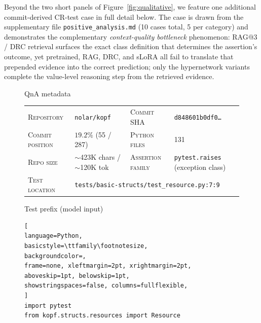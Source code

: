 \documentclass{llmxive}
\begin{document}
Beyond the two short panels of Figure~\ref{fig:qualitative}, we feature one additional commit-derived CR-test case in full detail below.
The case is drawn from the supplementary file \texttt{positive\_analysis.md} (10 cases total, 5 per category) and demonstrates the complementary \emph{context-quality bottleneck} phenomenon: RAG@3 / DRC retrieval surfaces the exact class definition that determines the assertion's outcome, yet pretrained, RAG, DRC, and sLoRA all fail to translate that prepended evidence into the correct prediction; only the hypernetwork variants complete the value-level reasoning step from the retrieved evidence.



\begin{figure}[!htbp]
\begin{center}
\begin{tcolorbox}[
enhanced,
colback=white, colframe=qexHead, coltitle=white,
fonttitle=\bfseries,
title={Detailed qualitative example: \texttt{nolar/kopf} (Code2LoRA-exclusive, CR test, commit-derived)},
arc=3pt, boxrule=0.6pt,
top=3pt, bottom=3pt, left=6pt, right=6pt,
]

\begin{qexsection}{QnA metadata}
\footnotesize
\begin{tabular}{@{}l@{\;\;}l@{\hskip 14pt}l@{\;\;}l@{}}
\textsc{Repository}      & \texttt{nolar/kopf}                         & \textsc{Commit SHA}        & \texttt{d848601b0df0\ldots} \\
\textsc{Commit position} & $19.2\%$ (55 / 287)                         & \textsc{Python files}      & 131 \\
\textsc{Repo size}       & $\sim$423K chars / $\sim$120K tok           & \textsc{Assertion family}  & \texttt{pytest.raises} (exception class) \\
\textsc{Test location}   & \multicolumn{3}{l}{\texttt{tests/basic-structs/test\_resource.py:7:9}} \\
\end{tabular}
\end{qexsection}

\begin{qexsection}{Test prefix (model input)}
\begin{lstlisting}[
language=Python,
basicstyle=\ttfamily\footnotesize,
backgroundcolor=,
frame=none, xleftmargin=2pt, xrightmargin=2pt,
aboveskip=1pt, belowskip=1pt,
showstringspaces=false, columns=fullflexible,
]
import pytest
from kopf.structs.resources import Resource


\end{lstlisting}
\end{qexsection}
\end{tcolorbox}
\end{center}
\end{figure}
\end{document}
